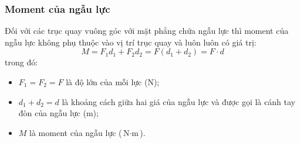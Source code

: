 \subsubsection{Moment của ngẫu lực}
Đối với các trục quay vuông góc với mặt phẳng chứa ngẫu lực thì moment của ngẫu lực không phụ thuộc vào vị trí trục quay và luôn luôn có giá trị: 
\begin{equation*}
	M=F_1d_1+F_2d_2=F(d_1+d_2)=F\cdot d
\end{equation*}
trong đó:
\begin{itemize}
	\item $F_1=F_2=F$ là độ lớn của mỗi lực ($\si{\newton}$);
	\item $d_1+d_2=d$ là khoảng cách giữa hai giá của ngẫu lực và được gọi là cánh tay đòn của ngẫu lực ($\si{\meter}$);
	\item $M$ là moment của ngẫu lực ($\si{\newton\cdot\meter}$).
\end{itemize}

